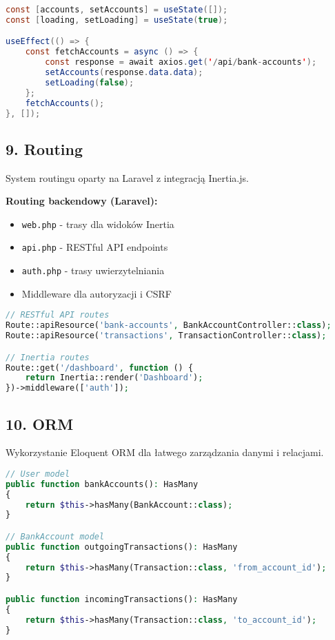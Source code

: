 \documentclass[12pt,a4paper]{article}
\begin{document}
    \begin{lstlisting}[language=Java, caption=Przykład komponentu React]
const [accounts, setAccounts] = useState([]);
const [loading, setLoading] = useState(true);

useEffect(() => {
    const fetchAccounts = async () => {
        const response = await axios.get('/api/bank-accounts');
        setAccounts(response.data.data);
        setLoading(false);
    };
    fetchAccounts();
}, []);
    \end{lstlisting}

    \subsection{9. Routing}

    System routingu oparty na Laravel z integracją Inertia.js.

    \textbf{Routing backendowy (Laravel):}
    \begin{itemize}
        \item \texttt{web.php} - trasy dla widoków Inertia
        \item \texttt{api.php} - RESTful API endpoints
        \item \texttt{auth.php} - trasy uwierzytelniania
        \item Middleware dla autoryzacji i CSRF
    \end{itemize}

    \begin{lstlisting}[language=PHP, caption=Przykłady tras]
// RESTful API routes
Route::apiResource('bank-accounts', BankAccountController::class);
Route::apiResource('transactions', TransactionController::class);

// Inertia routes
Route::get('/dashboard', function () {
    return Inertia::render('Dashboard');
})->middleware(['auth']);
    \end{lstlisting}

    \subsection{10. ORM}

    Wykorzystanie Eloquent ORM dla łatwego zarządzania danymi i relacjami.

    \begin{lstlisting}[language=PHP, caption=Modele z relacjami]
// User model
public function bankAccounts(): HasMany
{
    return $this->hasMany(BankAccount::class);
}

// BankAccount model
public function outgoingTransactions(): HasMany
{
    return $this->hasMany(Transaction::class, 'from_account_id');
}

public function incomingTransactions(): HasMany
{
    return $this->hasMany(Transaction::class, 'to_account_id');
}
    \end{lstlisting}
\end{document}
